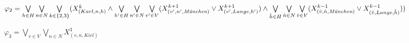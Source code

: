 $\varphi_2 = \bigvee\limits_{h \in H}\bigvee\limits_{n \in N}\bigvee\limits_{k \in \{2,3\}}
(
	X^k_{(Karl,n,h)} \\
	\wedge 
	\bigvee\limits_{h^{\prime } \in H}\bigvee\limits_{n^{\prime } \in N}\bigvee\limits_{v^{\prime } \in V}
	(
		X_{(v^{\prime },n^{\prime },\textit{München})}^{k+1} \vee
		X_{(v^{\prime },Lange,h^{\prime })}^{k+1}
	)\\
	\wedge
	\bigvee\limits_{\hat{h} \in H}\bigvee\limits_{\hat{n} \in N}\bigvee\limits_{\hat{v} \in V}
	(
		X_{(\hat{v},\hat{n},\textit{München})}^{k-1} \vee
		X_{(\hat{v},Lange,\hat{h})}^{k-1}
	)
)$

$\varphi_3 = \bigvee\limits_{v \in V}\bigvee\limits_{n \in N} X^3_{(v,n,Kiel)}$